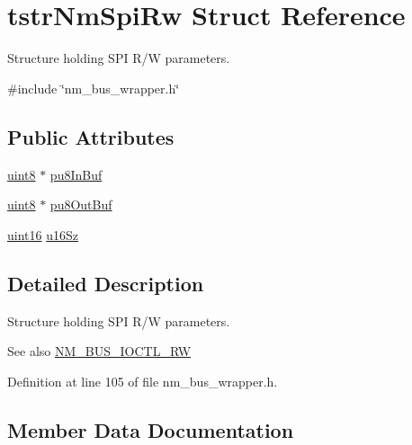 \hypertarget{structtstrNmSpiRw}{}\section{tstr\+Nm\+Spi\+Rw Struct Reference}
\label{structtstrNmSpiRw}


Structure holding S\+PI R/W parameters.  




{\ttfamily \#include \char`\"{}nm\+\_\+bus\+\_\+wrapper.\+h\char`\"{}}

\subsection*{Public Attributes}
\begin{DoxyCompactItemize}
\item 
\hyperlink{group__DataT_ga4df709a77647e870bbf1d955b8edc9a6}{uint8} $\ast$ \hyperlink{structtstrNmSpiRw_aa0a0dd7106812c8af780cb0729e2d1ef}{pu8\+In\+Buf}
\item 
\hyperlink{group__DataT_ga4df709a77647e870bbf1d955b8edc9a6}{uint8} $\ast$ \hyperlink{structtstrNmSpiRw_a6778f8ba906b9eb363ac0422fca66dd5}{pu8\+Out\+Buf}
\item 
\hyperlink{group__DataT_ga1daa745171fc6e31d942c161422a76f9}{uint16} \hyperlink{structtstrNmSpiRw_a7daa8262b96cb0543eb9189c65622c72}{u16\+Sz}
\end{DoxyCompactItemize}


\subsection{Detailed Description}
Structure holding S\+PI R/W parameters. 

\begin{DoxySeeAlso}{See also}
\hyperlink{nm__bus__wrapper_8h_a7c9c01416493afd57406928672066506}{N\+M\+\_\+\+B\+U\+S\+\_\+\+I\+O\+C\+T\+L\+\_\+\+RW} 
\end{DoxySeeAlso}


Definition at line 105 of file nm\+\_\+bus\+\_\+wrapper.\+h.



\subsection{Member Data Documentation}
\mbox{\label{structtstrNmSpiRw_aa0a0dd7106812c8af780cb0729e2d1ef}} 

